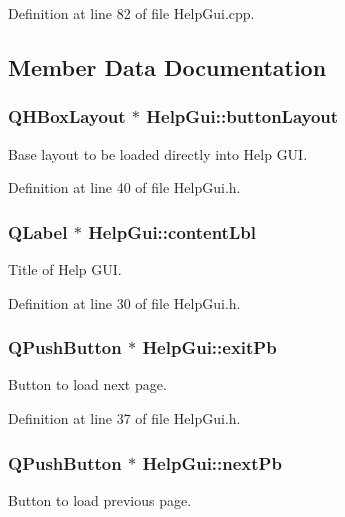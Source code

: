 Definition at line 82 of file Help\-Gui.\-cpp.



\subsection{Member Data Documentation}
\hypertarget{class_help_gui_a79e78c0205577c14278ec3eabc79a916}{
\subsubsection[{button\-Layout}]{\setlength{\rightskip}{0pt plus 5cm}Q\-H\-Box\-Layout $\ast$ Help\-Gui\-::button\-Layout\hspace{0.3cm}{\ttfamily [private]}}}\label{class_help_gui_a79e78c0205577c14278ec3eabc79a916}
Base layout to be loaded directly into Help G\-U\-I. 

Definition at line 40 of file Help\-Gui.\-h.

\hypertarget{class_help_gui_af8c1a67033fe6ad4db009074e0eec724}{
\subsubsection[{content\-Lbl}]{\setlength{\rightskip}{0pt plus 5cm}Q\-Label $\ast$ Help\-Gui\-::content\-Lbl\hspace{0.3cm}{\ttfamily [private]}}}\label{class_help_gui_af8c1a67033fe6ad4db009074e0eec724}
Title of Help G\-U\-I. 

Definition at line 30 of file Help\-Gui.\-h.

\hypertarget{class_help_gui_ab4363d4bdda8ccaa029619c73696a2ed}{
\subsubsection[{exit\-Pb}]{\setlength{\rightskip}{0pt plus 5cm}Q\-Push\-Button $\ast$ Help\-Gui\-::exit\-Pb\hspace{0.3cm}{\ttfamily [private]}}}\label{class_help_gui_ab4363d4bdda8ccaa029619c73696a2ed}
Button to load next page. 

Definition at line 37 of file Help\-Gui.\-h.

\hypertarget{class_help_gui_af2176ceb00942f14e24a1b8c3b2a7f6f}{
\subsubsection[{next\-Pb}]{\setlength{\rightskip}{0pt plus 5cm}Q\-Push\-Button $\ast$ Help\-Gui\-::next\-Pb\hspace{0.3cm}{\ttfamily [private]}}}\label{class_help_gui_af2176ceb00942f14e24a1b8c3b2a7f6f}
Button to load previous page. 

